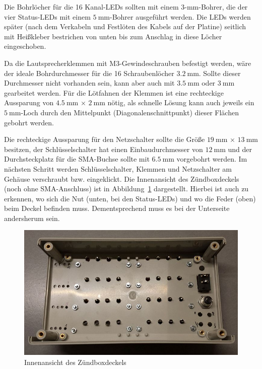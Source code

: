 \documentclass[paper=a4, parskip, numbers=noenddot, toc=listof, headsepline]{scrbook}
\begin{document}
				Die Bohrlöcher für die 16 Kanal-LEDs sollten mit einem 3-mm-Bohrer, die der vier Status-LEDs mit einem $\SI{5}{\milli\metre}$-Bohrer ausgeführt werden. Die LEDs werden später (nach dem Verkabeln und Festlöten des Kabels auf der Platine) seitlich mit Heißkleber bestrichen von unten bis zum Anschlag in diese Löcher eingeschoben.

				Da die Lautsprecherklemmen mit M3-Gewindeschrauben befestigt werden, wäre der ideale Bohrdurchmesser für die 16 Schraubenlöcher $\SI{3,2}{\milli\metre}$. Sollte dieser Durchmesser nicht vorhanden sein, kann aber auch mit $\SI{3,5}{\milli\metre}$ oder $\SI{3}{\milli\metre}$ gearbeitet werden. Für die Lötfahnen der Klemmen ist eine rechteckige Aussparung von $\SI{4,5}{\milli\metre}\,\times\,\SI{2}{\milli\metre}$ nötig, als schnelle Lösung kann auch jeweils ein $\SI{5}{\milli\metre}$-Loch durch den Mittelpunkt (Diagonalenschnittpunkt) dieser Flächen gebohrt werden.

				Die rechteckige Aussparung für den Netzschalter sollte die Größe $\SI{19}{\milli\metre}\,\times\,\SI{13}{\milli\metre}$ besitzen, der Schlüsselschalter hat einen Einbaudurchmesser von $\SI{12}{\milli\metre}$ und der Durchsteckplatz für die SMA-Buchse sollte mit $\SI{6,5}{\milli\metre}$ vorgebohrt werden. Im nächsten Schritt werden Schlüsselschalter, Klemmen und Netzschalter am Gehäuse verschraubt bzw. eingeklickt. Die Innenansicht des Zündboxdeckels (noch ohne SMA-Anschluss) ist in Abbildung~\ref{fig:zuendboxdeckel} dargestellt. Hierbei ist auch zu erkennen, wo sich die Nut (unten, bei den Status-LEDs) und wo die Feder (oben) beim Deckel befinden muss. Dementsprechend muss es bei der Unterseite andersherum sein.

				\begin{figure}
					\centering
					\includegraphics[width=\textwidth]{bilder/zuendboxdeckel}
					\caption{Innenansicht des Zündboxdeckels}
					\label{fig:zuendboxdeckel}
				\end{figure}
\end{document}
